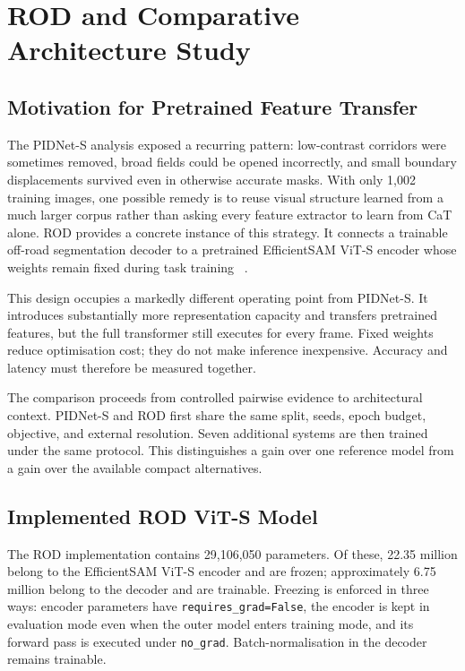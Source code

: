 \chapter{ROD and Comparative Architecture Study}
\label{ch:rod_extension}

\section{Motivation for Pretrained Feature Transfer}

The PIDNet-S analysis exposed a recurring pattern: low-contrast corridors
were sometimes removed, broad fields could be opened incorrectly, and small
boundary displacements survived even in otherwise accurate masks. With only
1,002 training images, one possible remedy is to reuse visual structure learned
from a much larger corpus rather than asking every feature extractor to learn
from CaT alone. ROD provides a concrete instance of this strategy. It connects
a trainable off-road segmentation decoder to a pretrained EfficientSAM ViT-S
encoder whose weights remain fixed during task training
~\cite{sun2025rod,xiong2024efficientsam}.

This design occupies a markedly different operating point from PIDNet-S. It
introduces substantially more representation capacity and transfers pretrained
features, but the full transformer still executes for every frame. Fixed
weights reduce optimisation cost; they do not make inference inexpensive.
Accuracy and latency must therefore be measured together.

The comparison proceeds from controlled pairwise evidence to architectural
context. PIDNet-S and ROD first share the same split, seeds, epoch budget,
objective, and external resolution. Seven additional systems are then trained
under the same protocol. This distinguishes a gain over one reference model
from a gain over the available compact alternatives.

\section{Implemented ROD ViT-S Model}

The ROD implementation contains 29,106,050 parameters. Of these, 22.35 million
belong to the EfficientSAM ViT-S encoder and are frozen; approximately 6.75
million belong to the decoder and are trainable. Freezing is enforced in three
ways: encoder parameters have \texttt{requires\_grad=False}, the encoder is
kept in evaluation mode even when the outer model enters training mode, and
its forward pass is executed under \texttt{no\_grad}. Batch-normalisation in
the decoder remains trainable.

